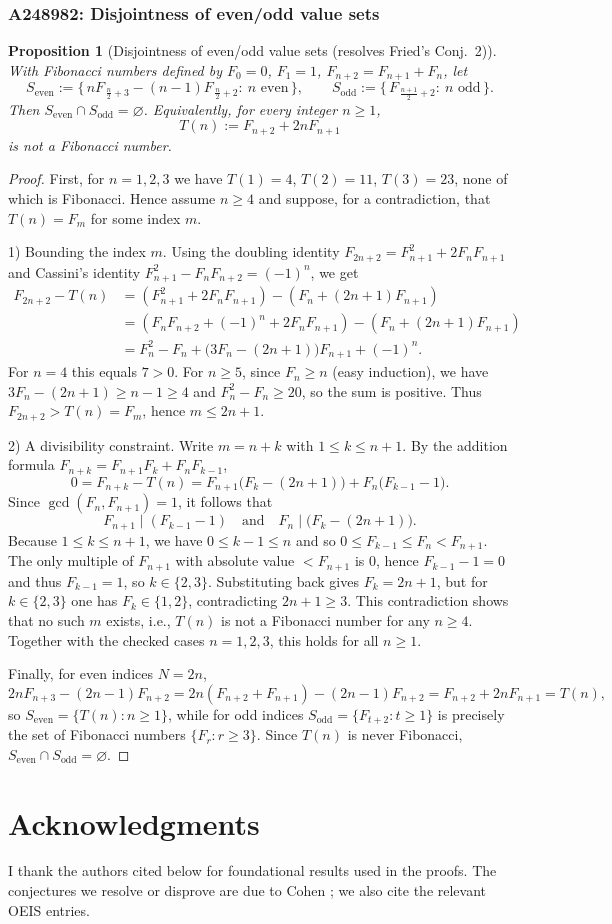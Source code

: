 \documentclass[12pt]{article}
\newtheorem{proposition}[theorem]{Proposition}
\theoremstyle{remark}
\begin{document}
\subsubsection{A248982: Disjointness of even/odd value sets}
\begin{proposition}[Disjointness of even/odd value sets (resolves Fried's Conj.~2)]\label{prop:disjointness}
With Fibonacci numbers defined by $F_0=0$, $F_1=1$, $F_{n+2}=F_{n+1}+F_n$, let
\[
 S_{\mathrm{even}}:=\bigl\{\,nF_{\,\frac{n}{2}+3}-(n-1)F_{\,\frac{n}{2}+2}:\ n\text{ even}\,\bigr\},\qquad
 S_{\mathrm{odd}}:=\bigl\{\,F_{\,\frac{n+1}{2}+2}:\ n\text{ odd}\,\bigr\}.
\]
Then $S_{\mathrm{even}}\cap S_{\mathrm{odd}}=\varnothing$. Equivalently, for every integer $n\ge1$,
\[
 T(n):=F_{n+2}+2nF_{n+1}
\]
is not a Fibonacci number.
\end{proposition}

\begin{proof}
First, for $n=1,2,3$ we have $T(1)=4$, $T(2)=11$, $T(3)=23$, none of which is Fibonacci. Hence assume $n\ge4$ and suppose, for a contradiction, that $T(n)=F_m$ for some index $m$.

1) Bounding the index $m$. Using the doubling identity $F_{2n+2}=F_{n+1}^2+2F_nF_{n+1}$ and Cassini's identity $F_{n+1}^2-F_nF_{n+2}=(-1)^n$, we get
\[
\begin{aligned}
F_{2n+2}-T(n)
&=(F_{n+1}^2+2F_nF_{n+1})-(F_n+(2n+1)F_{n+1})\\
&=(F_nF_{n+2}+(-1)^n+2F_nF_{n+1})-(F_n+(2n+1)F_{n+1})\\
&=F_n^2 - F_n + \bigl(3F_n-(2n+1)\bigr)F_{n+1} + (-1)^n.
\end{aligned}
\]
For $n=4$ this equals $7>0$. For $n\ge5$, since $F_n\ge n$ (easy induction), we have $3F_n-(2n+1)\ge n-1\ge4$ and $F_n^2-F_n\ge20$, so the sum is positive. Thus $F_{2n+2}>T(n)=F_m$, hence $m\le 2n+1$.

2) A divisibility constraint. Write $m=n+k$ with $1\le k\le n+1$. By the addition formula $F_{n+k}=F_{n+1}F_k+F_nF_{k-1}$,
\[
0=F_{n+k}-T(n)=F_{n+1}\bigl(F_k-(2n+1)\bigr)+F_n\bigl(F_{k-1}-1\bigr).
\]
Since $\gcd(F_n,F_{n+1})=1$, it follows that
\[
F_{n+1}\mid(F_{k-1}-1)\quad\text{and}\quad F_n\mid\bigl(F_k-(2n+1)\bigr).
\]
Because $1\le k\le n+1$, we have $0\le k-1\le n$ and so $0\le F_{k-1}\le F_n<F_{n+1}$. The only multiple of $F_{n+1}$ with absolute value $<F_{n+1}$ is $0$, hence $F_{k-1}-1=0$ and thus $F_{k-1}=1$, so $k\in\{2,3\}$. Substituting back gives $F_k=2n+1$, but for $k\in\{2,3\}$ one has $F_k\in\{1,2\}$, contradicting $2n+1\ge3$. This contradiction shows that no such $m$ exists, i.e., $T(n)$ is not a Fibonacci number for any $n\ge4$. Together with the checked cases $n=1,2,3$, this holds for all $n\ge1$.

Finally, for even indices $N=2n$,
\[
2nF_{n+3}-(2n-1)F_{n+2}=2n(F_{n+2}+F_{n+1})-(2n-1)F_{n+2}=F_{n+2}+2nF_{n+1}=T(n),
\]
so $S_{\mathrm{even}}=\{T(n):n\ge1\}$, while for odd indices $S_{\mathrm{odd}}=\{F_{t+2}:t\ge1\}$ is precisely the set of Fibonacci numbers $\{F_r:r\ge3\}$. Since $T(n)$ is never Fibonacci, $S_{\mathrm{even}}\cap S_{\mathrm{odd}}=\varnothing$.
\end{proof}

\section{Acknowledgments}
I thank the authors cited below for foundational results used in the proofs. The conjectures we resolve or disprove are due to Cohen \cite{Cohen2025}; we also cite the relevant OEIS entries.


\end{document}
